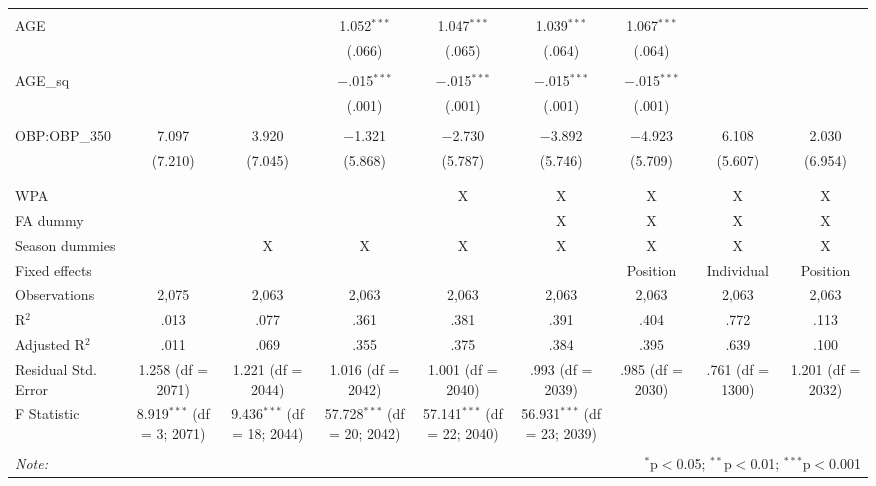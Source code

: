 \begin{table}[H]
\begin{tabular}{@{\extracolsep{5pt}}lcccccccc}
  & & & & & & & & \\
 AGE &  &  & 1.052$^{***}$ & 1.047$^{***}$ & 1.039$^{***}$ & 1.067$^{***}$ &  &  \\
  &  &  & (.066) & (.065) & (.064) & (.064) &  &  \\
  & & & & & & & & \\
 AGE\_sq &  &  & $-$.015$^{***}$ & $-$.015$^{***}$ & $-$.015$^{***}$ & $-$.015$^{***}$ &  &  \\
  &  &  & (.001) & (.001) & (.001) & (.001) &  &  \\
  & & & & & & & & \\
 OBP:OBP\_350 & 7.097 & 3.920 & $-$1.321 & $-$2.730 & $-$3.892 & $-$4.923 & 6.108 & 2.030 \\
  & (7.210) & (7.045) & (5.868) & (5.787) & (5.746) & (5.709) & (5.607) & (6.954) \\
  & & & & & & & & \\
\hline \\[-1.8ex]
WPA &  &  &  & X & X & X & X & X \\
FA dummy &  &  &  &  & X & X & X & X \\
Season dummies &  & X & X & X & X & X & X & X \\
Fixed effects &  &  &  &  &  & Position & Individual & Position \\
Observations & 2,075 & 2,063 & 2,063 & 2,063 & 2,063 & 2,063 & 2,063 & 2,063 \\
R$^{2}$ & .013 & .077 & .361 & .381 & .391 & .404 & .772 & .113 \\
Adjusted R$^{2}$ & .011 & .069 & .355 & .375 & .384 & .395 & .639 & .100 \\
Residual Std. Error & 1.258 (df = 2071) & 1.221 (df = 2044) & 1.016 (df = 2042) & 1.001 (df = 2040) & .993 (df = 2039) & .985 (df = 2030) & .761 (df = 1300) & 1.201 (df = 2032) \\
F Statistic & 8.919$^{***}$ (df = 3; 2071) & 9.436$^{***}$ (df = 18; 2044) & 57.728$^{***}$ (df = 20; 2042) & 57.141$^{***}$ (df = 22; 2040) & 56.931$^{***}$ (df = 23; 2039) &  &  &  \\
\hline
\hline \\[-1.8ex]
\textit{Note:}  & \multicolumn{8}{r}{$^{*}$p$<$0.05; $^{**}$p$<$0.01; $^{***}$p$<$0.001} \\
\end{tabular}
\end{table}
